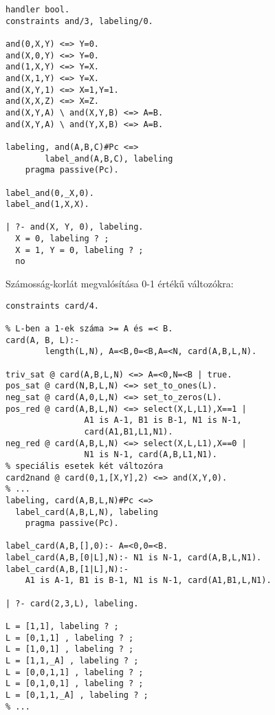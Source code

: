 \begin{verbatim}
handler bool.
constraints and/3, labeling/0. 

and(0,X,Y) <=> Y=0.                      
and(X,0,Y) <=> Y=0.                      
and(1,X,Y) <=> Y=X.                      
and(X,1,Y) <=> Y=X.                      
and(X,Y,1) <=> X=1,Y=1.                  
and(X,X,Z) <=> X=Z.                      
and(X,Y,A) \ and(X,Y,B) <=> A=B.         
and(X,Y,A) \ and(Y,X,B) <=> A=B.         
                                      
labeling, and(A,B,C)#Pc <=> 
        label_and(A,B,C), labeling               
    pragma passive(Pc).        
                               
label_and(0,_X,0).      
label_and(1,X,X).      

| ?- and(X, Y, 0), labeling.   
  X = 0, labeling ? ;          
  X = 1, Y = 0, labeling ? ;
  no
\end{verbatim}

Számosság-korlát megvalósítása 0-1 értékű változókra:

\begin{verbatim}
constraints card/4.

% L-ben a 1-ek száma >= A és =< B.
card(A, B, L):-  
        length(L,N), A=<B,0=<B,A=<N, card(A,B,L,N).

triv_sat @ card(A,B,L,N) <=> A=<0,N=<B | true.          
pos_sat @ card(N,B,L,N) <=> set_to_ones(L).             
neg_sat @ card(A,0,L,N) <=> set_to_zeros(L).            
pos_red @ card(A,B,L,N) <=> select(X,L,L1),X==1 |       
                A1 is A-1, B1 is B-1, N1 is N-1, 
                card(A1,B1,L1,N1).
neg_red @ card(A,B,L,N) <=> select(X,L,L1),X==0 | 
                N1 is N-1, card(A,B,L1,N1).
% speciális esetek két változóra
card2nand @ card(0,1,[X,Y],2) <=> and(X,Y,0).           
% ...
labeling, card(A,B,L,N)#Pc <=> 
  label_card(A,B,L,N), labeling
    pragma passive(Pc).

label_card(A,B,[],0):- A=<0,0=<B.
label_card(A,B,[0|L],N):- N1 is N-1, card(A,B,L,N1).
label_card(A,B,[1|L],N):- 
    A1 is A-1, B1 is B-1, N1 is N-1, card(A1,B1,L,N1).

| ?- card(2,3,L), labeling.

L = [1,1], labeling ? ;      
L = [0,1,1] , labeling ? ; 
L = [1,0,1] , labeling ? ;   
L = [1,1,_A] , labeling ? ; 
L = [0,0,1,1] , labeling ? ; 
L = [0,1,0,1] , labeling ? ; 
L = [0,1,1,_A] , labeling ? ;  
% ...
\end{verbatim}

